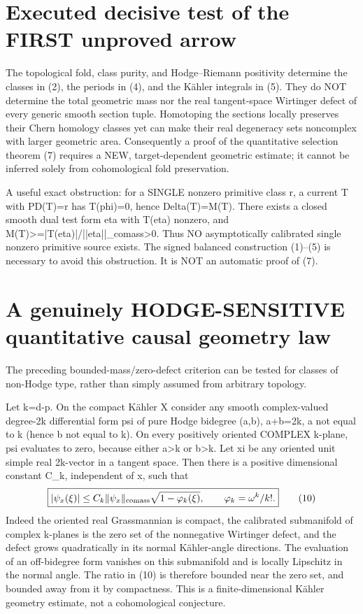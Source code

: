 \documentclass[11pt]{article}
\begin{document}
\section{Executed decisive test of the FIRST unproved arrow}
The topological fold, class purity,
and Hodge--Riemann positivity determine
the classes in (2), the periods in (4),
and the Kähler integrals in (5).
They do NOT determine the total geometric
mass nor the real tangent-space
Wirtinger defect of every generic
smooth section tuple. Homotoping the
sections locally preserves their
Chern homology classes yet can make
their real degeneracy sets noncomplex
with larger geometric area.
Consequently a proof of the quantitative
selection theorem (7) requires a NEW,
target-dependent geometric estimate;
it cannot be inferred solely from
cohomological fold preservation.

A useful exact obstruction: for a SINGLE
nonzero primitive class r, a current T
with PD(T)=r has
T(phi)=0, hence Delta(T)=M(T).
There exists a closed smooth dual test
form eta with T(eta) nonzero, and
M(T)>=|T(eta)|/||eta||_comass>0.
Thus NO asymptotically calibrated
single nonzero primitive source exists.
The signed balanced construction (1)--(5)
is necessary to avoid this obstruction.
It is NOT an automatic proof of (7).

\section{A genuinely HODGE-SENSITIVE quantitative causal geometry law}
The preceding bounded-mass/zero-defect
criterion can be tested for classes
of non-Hodge type, rather than simply
assumed from arbitrary topology.

Let k=d-p. On the compact Kähler X
consider any smooth complex-valued
degree-2k differential form psi
of pure Hodge bidegree (a,b), a+b=2k,
a not equal to k (hence b not equal to k).
On every positively oriented COMPLEX
k-plane, psi evaluates to zero, because
either a>k or b>k.
Let xi be any oriented unit simple
real 2k-vector in a tangent space.
Then there is a positive dimensional
constant C_k, independent of x,
such that
\[
 \boxed{
 |\psi_x(\xi)|\le
 C_k\|\psi_x\|_{\rm comass}
  \sqrt{1-\varphi_k(\xi)},
 \qquad \varphi_k=\omega^k/k!.
 }                                                       \tag{10}
\]
Indeed the oriented real Grassmannian
is compact, the calibrated submanifold
of complex k-planes is the zero set
of the nonnegative Wirtinger defect,
and the defect grows quadratically
in its normal Kähler-angle directions.
The evaluation of an off-bidegree
form vanishes on this submanifold
and is locally Lipschitz in the
normal angle. The ratio in (10)
is therefore bounded near the
zero set, and bounded away from
it by compactness. This is a
finite-dimensional Kähler
geometry estimate, not a
cohomological conjecture.
\end{document}
